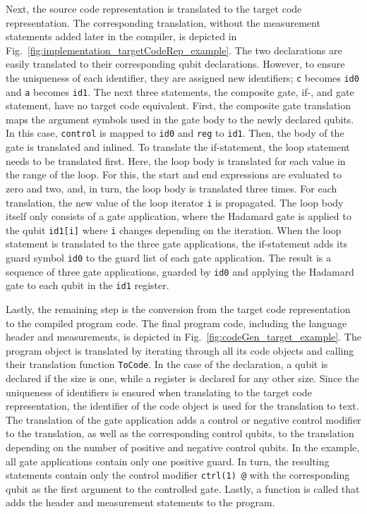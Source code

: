 Next, the source code representation is translated to the target code representation. The corresponding translation, without the measurement statements added later in the compiler, is depicted in Fig.~\ref{fig:implementation_targetCodeRep_example}. The two declarations are easily translated to their corresponding qubit declarations. However, to ensure the uniqueness of each identifier, they are assigned new identifiers; \texttt{c} becomes \texttt{id0} and \texttt{a} becomes \texttt{id1}. The next three statements, the composite gate, if-, and gate statement, have no target code equivalent. First, the composite gate translation maps the argument symbols used in the gate body to the newly declared qubits. In this case, \texttt{control} is mapped to \texttt{id0} and \texttt{reg} to \texttt{id1}. Then, the body of the gate is translated and inlined. To translate the if-statement, the loop statement needs to be translated first. Here, the loop body is translated for each value in the range of the loop. For this, the start and end expressions are evaluated to zero and two, and, in turn, the loop body is translated three times. For each translation, the new value of the loop iterator \texttt{i} is propagated. The loop body itself only consists of a gate application, where the Hadamard gate is applied to the qubit \texttt{id1[i]} where \texttt{i} changes depending on the iteration. When the loop statement is translated to the three gate applications, the if-statement adds its guard symbol \texttt{id0} to the guard list of each gate application. The result is a sequence of three gate applications, guarded by \texttt{id0} and applying the Hadamard gate to each qubit in the \texttt{id1} register.

Lastly, the remaining step is the conversion from the target code representation to the compiled program code. The final program code, including the language header and measurements, is depicted in Fig.~\ref{fig:codeGen_target_example}. The program object is translated by iterating through all its code objects and calling their translation function \texttt{ToCode}. In the case of the declaration, a qubit is declared if the size is one, while a register is declared for any other size. Since the uniqueness of identifiers is ensured when translating to the target code representation, the identifier of the code object is used for the translation to text. The translation of the gate application adds a control or negative control modifier to the translation, as well as the corresponding control qubits, to the translation depending on the number of positive and negative control qubits. In the example, all gate applications contain only one positive guard. In turn, the resulting statements contain only the control modifier \texttt{ctrl(1) @} with the corresponding qubit as the first argument to the controlled gate. Lastly, a function is called that adds the header and measurement statements to the program.

